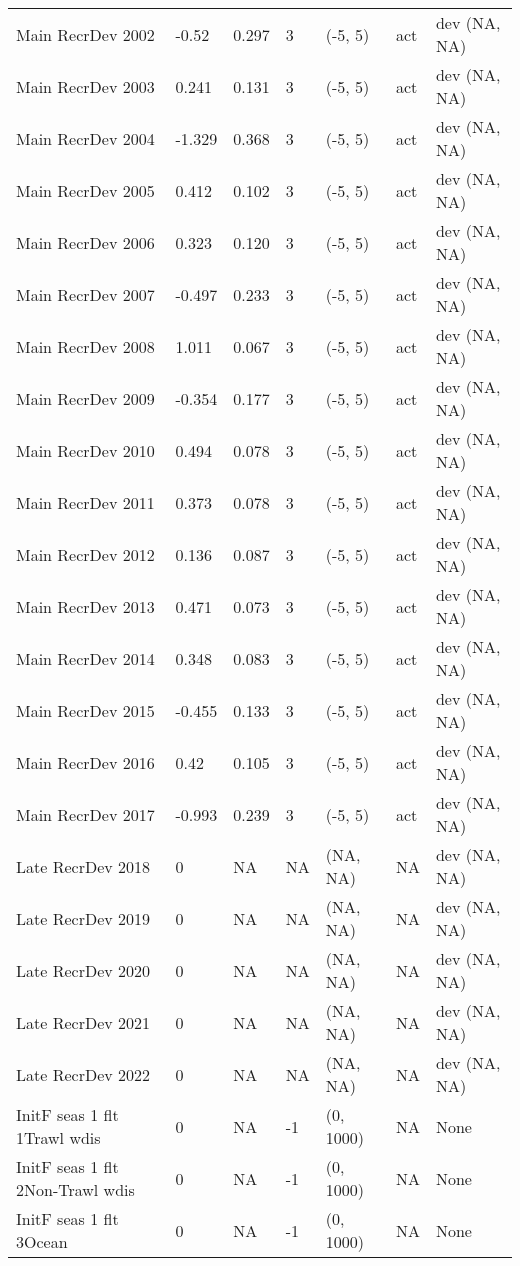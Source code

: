 \documentclass[11pt,
  english,
  letterpaper,
]{article}
\begin{document}
\begin{landscape}
\begin{longtable}[t]{>{\raggedright\arraybackslash}p{7.5cm}lllll>{\raggedright\arraybackslash}p{3.5cm}}
Main RecrDev 2002 & -0.52 & 0.297 & 3 & (-5, 5) & act & dev (NA, NA)\\
Main RecrDev 2003 & 0.241 & 0.131 & 3 & (-5, 5) & act & dev (NA, NA)\\
Main RecrDev 2004 & -1.329 & 0.368 & 3 & (-5, 5) & act & dev (NA, NA)\\
Main RecrDev 2005 & 0.412 & 0.102 & 3 & (-5, 5) & act & dev (NA, NA)\\
Main RecrDev 2006 & 0.323 & 0.120 & 3 & (-5, 5) & act & dev (NA, NA)\\
Main RecrDev 2007 & -0.497 & 0.233 & 3 & (-5, 5) & act & dev (NA, NA)\\
Main RecrDev 2008 & 1.011 & 0.067 & 3 & (-5, 5) & act & dev (NA, NA)\\
Main RecrDev 2009 & -0.354 & 0.177 & 3 & (-5, 5) & act & dev (NA, NA)\\
Main RecrDev 2010 & 0.494 & 0.078 & 3 & (-5, 5) & act & dev (NA, NA)\\
Main RecrDev 2011 & 0.373 & 0.078 & 3 & (-5, 5) & act & dev (NA, NA)\\
Main RecrDev 2012 & 0.136 & 0.087 & 3 & (-5, 5) & act & dev (NA, NA)\\
Main RecrDev 2013 & 0.471 & 0.073 & 3 & (-5, 5) & act & dev (NA, NA)\\
Main RecrDev 2014 & 0.348 & 0.083 & 3 & (-5, 5) & act & dev (NA, NA)\\
Main RecrDev 2015 & -0.455 & 0.133 & 3 & (-5, 5) & act & dev (NA, NA)\\
Main RecrDev 2016 & 0.42 & 0.105 & 3 & (-5, 5) & act & dev (NA, NA)\\
Main RecrDev 2017 & -0.993 & 0.239 & 3 & (-5, 5) & act & dev (NA, NA)\\
Late RecrDev 2018 & 0 & NA & NA & (NA, NA) & NA & dev (NA, NA)\\
Late RecrDev 2019 & 0 & NA & NA & (NA, NA) & NA & dev (NA, NA)\\
Late RecrDev 2020 & 0 & NA & NA & (NA, NA) & NA & dev (NA, NA)\\
Late RecrDev 2021 & 0 & NA & NA & (NA, NA) & NA & dev (NA, NA)\\
Late RecrDev 2022 & 0 & NA & NA & (NA, NA) & NA & dev (NA, NA)\\
InitF seas 1 flt 1Trawl wdis & 0 & NA & -1 & (0, 1000) & NA & None\\
InitF seas 1 flt 2Non-Trawl wdis & 0 & NA & -1 & (0, 1000) & NA & None\\
InitF seas 1 flt 3Ocean & 0 & NA & -1 & (0, 1000) & NA & None\\

\end{longtable}
\end{landscape}
\end{document}
